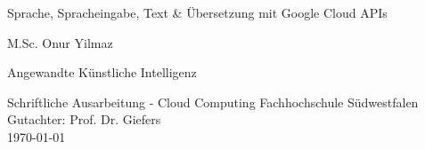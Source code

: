 \documentclass[12pt,a4paper]{article}
\begin{document}
	
		
		\begin{titlepage}
			\begin{center}
				\vspace*{1cm}
				\Huge
				Sprache, Spracheingabe, Text \& Übersetzung mit Google Cloud APIs
				
				
				\vspace{1.5cm}
				\LARGE
				M.Sc. Onur Yilmaz
				
				\vspace{1.5cm}
				\Large
				Angewandte Künstliche Intelligenz
				
				\vfill
				
				Schriftliche Ausarbeitung - Cloud Computing
				\vspace{0.5cm}
				\large
				Fachhochschule Südwestfalen
				\vspace{0.8cm}
				\Large
				\\
				Gutachter: Prof. Dr. Giefers
				\\
				\vspace{0.5cm}
				\large		
				\today
			\end{center}
		\end{titlepage}

\thispagestyle{empty}
\tableofcontents

\newpage
\end{document}
